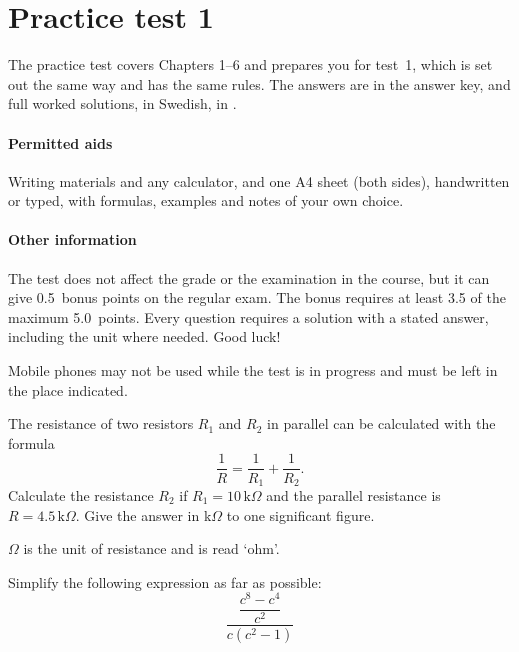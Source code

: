 
\clearpage
\section{Practice test 1}
\label{c6:sec:ovningsdugga}
The practice test covers Chapters 1--6 and prepares you for test~1, which is set out the same way
and has the same rules. The answers are in the answer key, and full worked solutions, in Swedish,
in .

\paragraph{Permitted aids} Writing materials and any calculator, and one A4 sheet (both sides),
handwritten or typed, with formulas, examples and notes of your own choice.

\paragraph{Other information} The test does not affect the grade or the examination in the
course, but it can give 0.5~bonus points on the regular exam. The bonus requires at least 3.5 of
the maximum 5.0~points. Every question requires a solution with a stated answer, including the
unit where needed. Good luck!

\begin{aside}
\note[Note] Mobile phones may not be used while the test is in progress and must be left in the
place indicated.
\end{aside}


The resistance of two resistors $R_1$ and $R_2$ in parallel can be calculated with the formula
\[
  \frac{1}{R} = \frac{1}{R_1} + \frac{1}{R_2}.
\]
Calculate the resistance $R_2$ if $R_1 = 10\,\text{k}\Omega$ and the parallel resistance is
$R = 4.5\,\text{k}\Omega$. Give the answer in k$\Omega$ to one significant figure.

\begin{aside}
\note[Note] $\Omega$ is the unit of resistance and is read ‘ohm’.
\end{aside}

Simplify the following expression as far as possible:
\[
  \frac{\dfrac{c^8 - c^4}{c^2}}{c(c^2 - 1)}
\]

